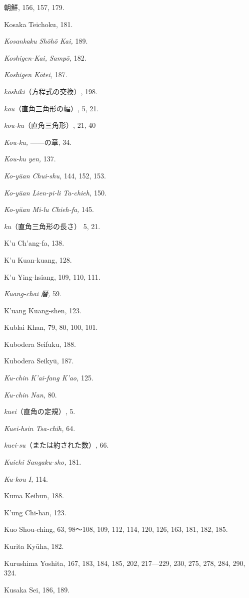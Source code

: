 \documentclass[11pt]{article}
\begin{document}
朝鮮, 156, 157, 179.\par
Kosaka Teichoku, 181.\par
\emph{Kosankaku Shōhō Kai,} 189.\par
\emph{Koshigen-Kai,} \emph{Sampō,} 182.\par
\emph{Koshigen Kōtei,} 187.\par
\emph{kōshiki}（方程式の交換）, 198.\par
\emph{kou}（直角三角形の幅）, 5, 21.\par
\emph{kou-ku}（直角三角形）, 21, 40\par
\emph{Kou-ku,} ――の章, 34.\par
\emph{Kou-ku yen,} 137.\par
\emph{Ko-yüan Chui-shu,} 144, 152, 153.\par
\emph{Ko-yüan Lien-pi-li Ta-chieh,} 150.\par
\emph{Ko-yüan Mi-lu Chieh-fa,} 145.\par
\emph{ku}（直角三角形の長さ） 5, 21.\par
K'u Ch'ang-fa, 138.\par
K'u Kuan-kuang, 128.\par
K'u Ying-hsiang, 109, 110, 111.\par
\emph{Kuang-chai 暦,} 59.\par
K'uang Kuang-shen, 123.\par
Kublai Khan, 79, 80, 100, 101.\par
Kubodera Seifuku, 188.\par
Kubodera Seikyū, 187.\par
\emph{Ku-chin K'ai-fang K'ao,} 125.\par
\emph{Ku-chin Nan,} 80.\par
\emph{kuei}（直角の定規）, 5.\par
\emph{Kuei-hsin Tsa-chih,} 64.\par
\emph{kuei-su}（または約された数）, 66.\par
\emph{Kuichi Sangaku-sho,} 181.\par
\emph{Ku-kou I,} 114.\par
Kuma Keibun, 188.\par
K'ung Chi-han, 123.\par
Kuo Shou-ching, 63, 98〜108, 109, 112, 114, 120, 126, 163, 181, 182, 185.\par
Kurita Kyūha, 182.\par
Kurushima Yoshita, 167, 183, 184, 185, 202, 217---229, 230, 275, 278, 284, 290, 324.\par
Kusaka Sei, 186, 189.\par
\end{document}
